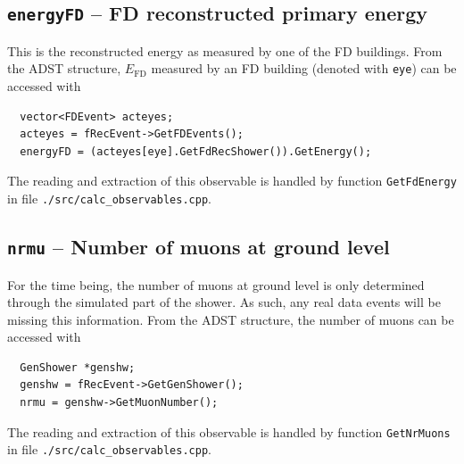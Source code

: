 \documentclass[12pt,a4paper]{report}
\begin{document}
\subsection{\texttt{energyFD} -- FD reconstructed primary energy}
This is the reconstructed energy as measured by one of the FD buildings. From the ADST structure, $E_{\textrm{FD}}$ measured by an FD building (denoted with \texttt{eye}) can be accessed with
\begin{verbatim}
  vector<FDEvent> acteyes;
  acteyes = fRecEvent->GetFDEvents();
  energyFD = (acteyes[eye].GetFdRecShower()).GetEnergy();
\end{verbatim}
The reading and extraction of this observable is handled by function \texttt{GetFdEnergy} in file \texttt{./src/calc\_observables.cpp}.

\subsection{\texttt{nrmu} -- Number of muons at ground level}
For the time being, the number of muons at ground level is only determined through the simulated part of the shower. As such, any real data events will be missing this information. From the ADST structure, the number of muons can be accessed with
\begin{verbatim}
  GenShower *genshw;
  genshw = fRecEvent->GetGenShower();
  nrmu = genshw->GetMuonNumber();
\end{verbatim}
The reading and extraction of this observable is handled by function \texttt{GetNrMuons} in file \texttt{./src/calc\_observables.cpp}.
\end{document}
